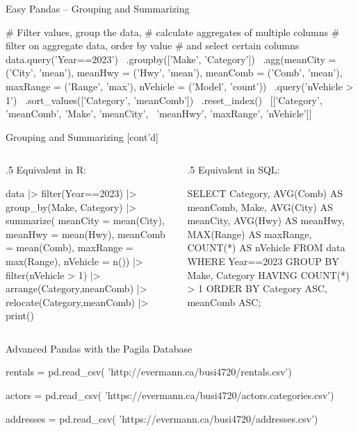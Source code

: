 \documentclass[ignorenonframetext,xcolor=x11names]{beamer}
\begin{document}
\begin{frame}[label=full,fragile]{Easy Pandas -- Grouping and Summarizing}
\begin{pythoncode}
# Filter values, group the data,
# calculate aggregates of multiple columns
# filter on aggregate data, order by value
# and select certain columns
data.query('Year==2023') \
    .groupby(['Make', 'Category']) \
    .agg(meanCity = ('City', 'mean'),
         meanHwy = ('Hwy', 'mean'),
         meanComb = ('Comb', 'mean'),
         maxRange = ('Range', 'max'),
         nVehicle = ('Model', 'count')) \
    .query('nVehicle > 1') \
    .sort_values(['Category', 'meanComb']) \
    .reset_index() \
    [['Category', 'meanComb', 'Make', 'meanCity', \
      'meanHwy', 'maxRange', 'nVehicle']]
\end{pythoncode}

\end{frame}
\begin{frame}[label=full,fragile]{Grouping and Summarizing \small [cont'd]}
\begin{columns}
\begin{column}{.5\textwidth}
Equivalent in R:
\begin{Rcode}
data |> 
  filter(Year==2023) |> 
  group_by(Make, Category) |>
  summarize(
       meanCity = mean(City), 
       meanHwy = mean(Hwy),
       meanComb = mean(Comb),
       maxRange = max(Range),
       nVehicle = n()) |>
  filter(nVehicle > 1) |>
  arrange(Category,meanComb) |>
  relocate(Category,meanComb) |>
  print()
\end{Rcode}
\end{column}
\begin{column}{.5\textwidth}
Equivalent in SQL:

\begin{sqlcode}
SELECT Category, 
       AVG(Comb) AS meanComb,
       Make,
       AVG(City) AS meanCity,
       AVG(Hwy) AS meanHwy,
       MAX(Range) AS maxRange,
       COUNT(*) AS nVehicle
   FROM data 
   WHERE Year==2023
   GROUP BY Make, Category
   HAVING COUNT(*) > 1
   ORDER BY Category ASC, 
            meanComb ASC;
\end{sqlcode}
\end{column}
\end{columns}
\end{frame}

\begin{frame}[label=full,fragile]{Advanced Pandas with the Pagila Database}
\begin{pythoncode}
rentals = pd.read_csv(
     'http://evermann.ca/busi4720/rentals.csv')
     
actors = pd.read_csv(
     'https://evermann.ca/busi4720/actors.categories.csv')
     
addresses = pd.read_csv(
     'https://evermann.ca/busi4720/addresses.csv')
\end{pythoncode}
\end{frame}
\end{document}
